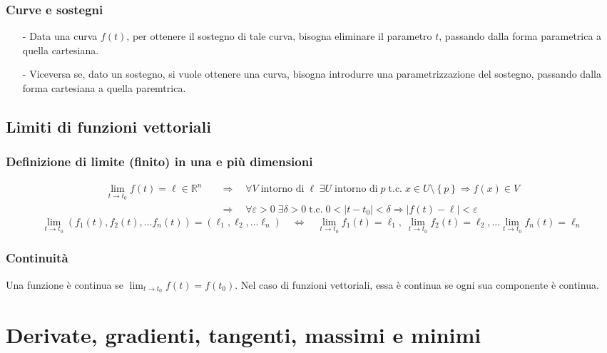 \documentclass[a4paper]{article}
\newcommand\Rn{\mathbb{R}^n}  %
\newcommand\tc{\text{t.c.}}   %
\begin{document}
\subsubsection*{Curve e sostegni}
\begin{itemize}[topsep=3pt, itemsep=0pt]
	\item[-] Data una curva \(f(t)\), per ottenere il sostegno di tale curva, bisogna eliminare il parametro \(t\), passando dalla
	forma parametrica a quella cartesiana.
	\item[-] Viceversa se, dato un sostegno, si vuole ottenere una curva, bisogna introdurre una parametrizzazione del sostegno,
	passando dalla forma cartesiana a quella paremtrica.
\end{itemize}

\subsection{Limiti di funzioni vettoriali}
\subsubsection*{Definizione di limite (finito) in una e più dimensioni}
\begin{align*}
	\lim_{t \to t_0} f(t) = \ell \in \Rn \quad &\Rightarrow \quad \forall V \; \text{intorno di} \; \ell \; \exists U \; \text{intorno di} \; p \; \tc \; x \in U \setminus \left\{p\right\} \Rightarrow f(x) \in V \\
	&\Rightarrow \quad \forall \varepsilon > 0 \; \exists \delta > 0 \; \tc \; 0 < \left|t-t_0\right| < \delta \Rightarrow \left|f(t) - \ell\right| < \varepsilon
\end{align*}
\[\lim_{t \to t_0} (f_1(t), f_2(t), \dots f_n(t)) = (\ell_1, \ell_2, \dots \ell_n) \quad \Leftrightarrow \quad \lim_{t \to t_0} f_1(t) = \ell_1, \; \lim_{t \to t_0} f_2(t) = \ell_2, \dots \lim_{t \to t_0} f_n(t) = \ell_n\]

\subsubsection*{Continuità}
Una funzione è continua se \(\lim_{t \to t_0} f(t) = f(t_0)\). Nel caso di funzioni vettoriali, essa è continua se ogni sua componente
è continua.

\newpage


\section{ Derivate, gradienti, tangenti, massimi e minimi}
\end{document}
